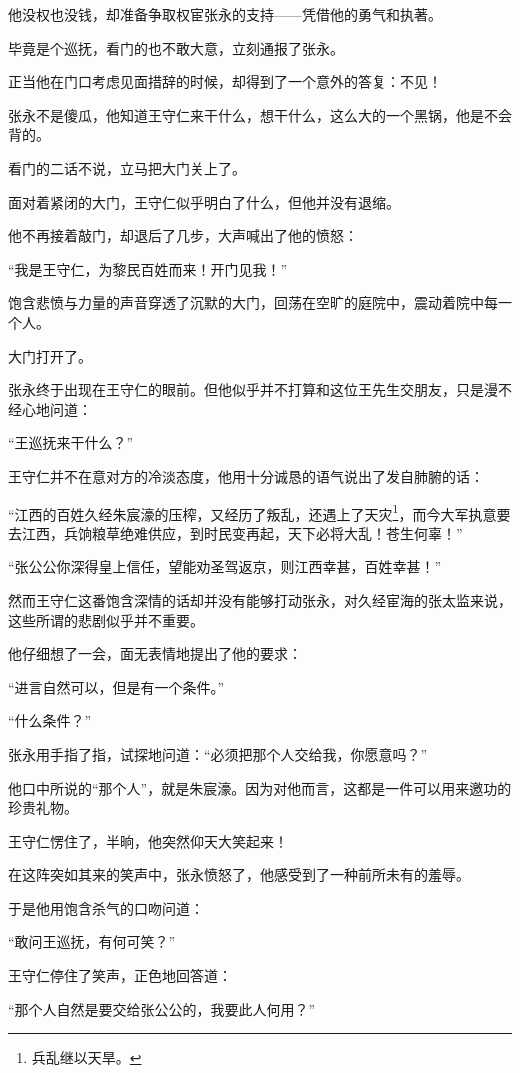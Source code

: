 \begin{multicols}{\theparacolNo}
他没权也没钱，却准备争取权宦张永的支持——凭借他的勇气和执著。

毕竟是个巡抚，看门的也不敢大意，立刻通报了张永。

正当他在门口考虑见面措辞的时候，却得到了一个意外的答复：不见！

张永不是傻瓜，他知道王守仁来干什么，想干什么，这么大的一个黑锅，他是不会背的。

看门的二话不说，立马把大门关上了。

面对着紧闭的大门，王守仁似乎明白了什么，但他并没有退缩。

他不再接着敲门，却退后了几步，大声喊出了他的愤怒：

“我是王守仁，为黎民百姓而来！开门见我！”

饱含悲愤与力量的声音穿透了沉默的大门，回荡在空旷的庭院中，震动着院中每一个人。

大门打开了。

张永终于出现在王守仁的眼前。但他似乎并不打算和这位王先生交朋友，只是漫不经心地问道：

“王巡抚来干什么？”

王守仁并不在意对方的冷淡态度，他用十分诚恳的语气说出了发自肺腑的话：

“江西的百姓久经朱宸濠的压榨，又经历了叛乱，还遇上了天灾\footnote{兵乱继以天旱。}，而今大军执意要去江西，兵饷粮草绝难供应，到时民变再起，天下必将大乱！苍生何辜！”

“张公公你深得皇上信任，望能劝圣驾返京，则江西幸甚，百姓幸甚！”

然而王守仁这番饱含深情的话却并没有能够打动张永，对久经宦海的张太监来说，这些所谓的悲剧似乎并不重要。

他仔细想了一会，面无表情地提出了他的要求：

“进言自然可以，但是有一个条件。”

“什么条件？”

张永用手指了指，试探地问道：“必须把那个人交给我，你愿意吗？”

他口中所说的“那个人”，就是朱宸濠。因为对他而言，这都是一件可以用来邀功的珍贵礼物。

王守仁愣住了，半晌，他突然仰天大笑起来！

在这阵突如其来的笑声中，张永愤怒了，他感受到了一种前所未有的羞辱。

于是他用饱含杀气的口吻问道：

“敢问王巡抚，有何可笑？”

王守仁停住了笑声，正色地回答道：

“那个人自然是要交给张公公的，我要此人何用？”


\end{multicols}

